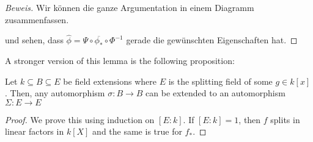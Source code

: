 \begin{proof}[Beweis]
Wir können die ganze Argumentation in einem Diagramm zusammenfassen.
\begin{center}
\end{center}
und sehen, dass $\widehat{\phi} = \Psi \circ \overline{\phi_\ast} \circ \Phi^{-1}$ gerade die gewünschten Eigenschaften hat.
\end{proof}


A stronger version of this lemma is the following proposition:
\begin{prop}[]\label{prop:2-16}
  Let $k \subseteq B \subseteq E$ be field extensions where $E$ is the splitting field of some $g \in k[x]$.
  Then, any automorphism $\sigma: B \to B$ can be extended to an automorphism $\Sigma: E \to  E$
\end{prop}
\begin{proof}
  We prove this using induction on $[E:k]$. If $[E:k]=1$, then $f$ splits in linear factors in $k[X]$ and the same is true for $f_\ast$.
\end{proof}
